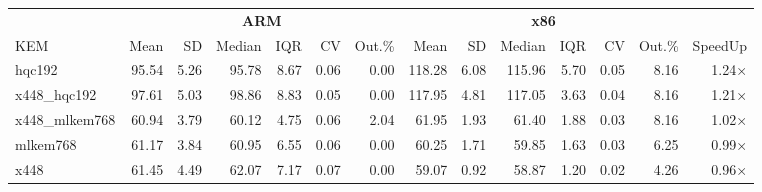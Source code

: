 \begin{table}[!ht]
\centering
\begin{tabular}{l|rrrrrr|rrrrrr|r}
\toprule
& \multicolumn{6}{c}{\bfseries ARM} & \multicolumn{6}{c}{\bfseries x86} & \\
\cmidrule(lr){2-7} \cmidrule(lr){8-13}
KEM & Mean & SD & Median & IQR & CV & Out.\% & Mean & SD & Median & IQR & CV & Out.\% & SpeedUp \\
\midrule
hqc192 & 95.54 & 5.26 & 95.78 & 8.67 & 0.06 & 0.00 & 118.28 & 6.08 & 115.96 & 5.70 & 0.05 & 8.16 & 1.24× \\
x448_hqc192 & 97.61 & 5.03 & 98.86 & 8.83 & 0.05 & 0.00 & 117.95 & 4.81 & 117.05 & 3.63 & 0.04 & 8.16 & 1.21× \\
x448_mlkem768 & 60.94 & 3.79 & 60.12 & 4.75 & 0.06 & 2.04 & 61.95 & 1.93 & 61.40 & 1.88 & 0.03 & 8.16 & 1.02× \\
mlkem768 & 61.17 & 3.84 & 60.95 & 6.55 & 0.06 & 0.00 & 60.25 & 1.71 & 59.85 & 1.63 & 0.03 & 6.25 & 0.99× \\
x448 & 61.45 & 4.49 & 62.07 & 7.17 & 0.07 & 0.00 & 59.07 & 0.92 & 58.87 & 1.20 & 0.02 & 4.26 & 0.96× \\
\bottomrule
\end{tabular}
\end{table}
